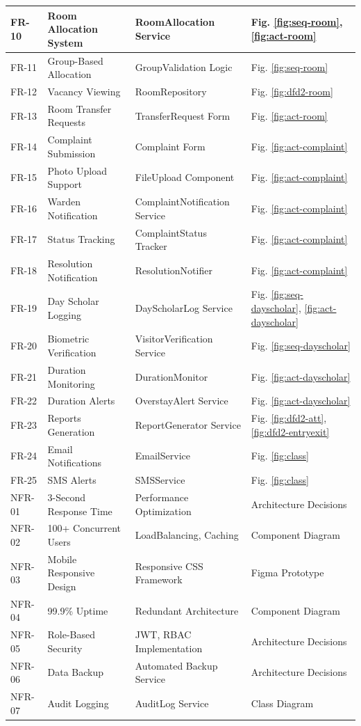 \documentclass[12pt]{article}
\begin{document}
\begin{longtable}{|p{2cm}|p{4cm}|p{4cm}|p{4cm}|}
\hline
FR-10 & Room Allocation System & RoomAllocation Service & Fig. \ref{fig:seq-room}, \ref{fig:act-room} \\
\hline
FR-11 & Group-Based Allocation & GroupValidation Logic & Fig. \ref{fig:seq-room} \\
\hline
FR-12 & Vacancy Viewing & RoomRepository & Fig. \ref{fig:dfd2-room} \\
\hline
FR-13 & Room Transfer Requests & TransferRequest Form & Fig. \ref{fig:act-room} \\
\hline
FR-14 & Complaint Submission & Complaint Form & Fig. \ref{fig:act-complaint} \\
\hline
FR-15 & Photo Upload Support & FileUpload Component & Fig. \ref{fig:act-complaint} \\
\hline
FR-16 & Warden Notification & ComplaintNotification Service & Fig. \ref{fig:act-complaint} \\
\hline
FR-17 & Status Tracking & ComplaintStatus Tracker & Fig. \ref{fig:act-complaint} \\
\hline
FR-18 & Resolution Notification & ResolutionNotifier & Fig. \ref{fig:act-complaint} \\
\hline
FR-19 & Day Scholar Logging & DayScholarLog Service & Fig. \ref{fig:seq-dayscholar}, \ref{fig:act-dayscholar} \\
\hline
FR-20 & Biometric Verification & VisitorVerification Service & Fig. \ref{fig:seq-dayscholar} \\
\hline
FR-21 & Duration Monitoring & DurationMonitor & Fig. \ref{fig:act-dayscholar} \\
\hline
FR-22 & Duration Alerts & OverstayAlert Service & Fig. \ref{fig:act-dayscholar} \\
\hline
FR-23 & Reports Generation & ReportGenerator Service & Fig. \ref{fig:dfd2-att}, \ref{fig:dfd2-entryexit} \\
\hline
FR-24 & Email Notifications & EmailService & Fig. \ref{fig:class} \\
\hline
FR-25 & SMS Alerts & SMSService & Fig. \ref{fig:class} \\
\hline
NFR-01 & 3-Second Response Time & Performance Optimization & Architecture Decisions \\
\hline
NFR-02 & 100+ Concurrent Users & LoadBalancing, Caching & Component Diagram \\
\hline
NFR-03 & Mobile Responsive Design & Responsive CSS Framework & Figma Prototype \\
\hline
NFR-04 & 99.9\% Uptime & Redundant Architecture & Component Diagram \\
\hline
NFR-05 & Role-Based Security & JWT, RBAC Implementation & Architecture Decisions \\
\hline
NFR-06 & Data Backup & Automated Backup Service & Architecture Decisions \\
\hline
NFR-07 & Audit Logging & AuditLog Service & Class Diagram \\
\hline
\end{longtable}
\end{document}
